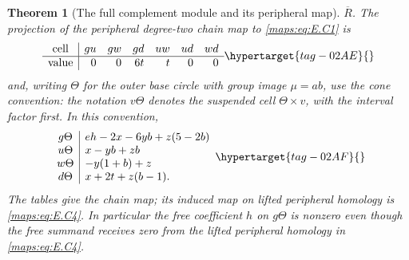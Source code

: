 \documentclass[11pt,a4paper]{article}
\numberwithin{equation}{section}
\newtheorem{theorem}{Theorem}[section]
\theoremstyle{definition}
\begin{document}
\begin{theorem}[The full complement module and its peripheral map]
$\overline R$. The projection of the peripheral degree-two
chain map to \eqref{maps:eq:E.C1} is
\begin{equation}
 \begin{array}{c|rrrrrr}
 \text{cell}&gu&gw&gd&uw&ud&wd\\ \hline
 \text{value}&0&0&6t&t&0&0
 \end{array}
 \hypertarget{tag-02AE}{}\label{maps:eq:E.C19a}
\end{equation}
and, writing $\Theta$ for the outer base circle with
group image $\mu=ab$, use the cone convention: the
notation $v\Theta$ denotes the suspended cell
$\Theta\times v$, with the interval factor first.
In this convention,
\begin{equation}
 \begin{array}{c|l}
  g\Theta&eh-2x-6yb+z(5-2b)\\
  u\Theta&x-yb+zb\\
  w\Theta&-y(1+b)+z\\
  d\Theta&x+2t+z(b-1).
 \end{array}
 \hypertarget{tag-02AF}{}\label{maps:eq:E.C19b}
\end{equation}
The tables give the chain map; its induced map on lifted peripheral homology is \eqref{maps:eq:E.C4}. In
particular the free coefficient $h$ on $g\Theta$
is nonzero even though the free summand receives
zero from the lifted peripheral homology in \eqref{maps:eq:E.C4}.


\end{theorem}
\end{document}
